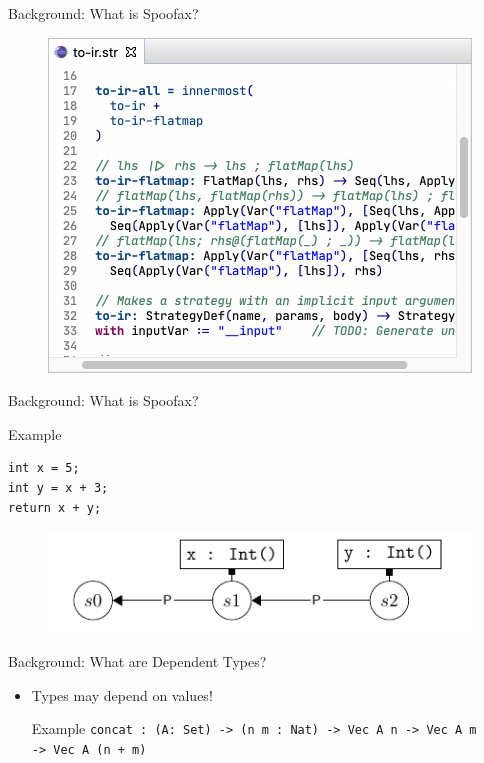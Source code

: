 \documentclass[aspectratio=43]{beamer}
\begin{document}
\begin{frame}[fragile]{Background: What is Spoofax?}
	\begin{figure}
		\includegraphics[width=0.8\linewidth]{img/transformation}
	\end{figure}
\end{frame}

\begin{frame}[fragile]{Background: What is Spoofax?}

\begin{exampleblock}{Example}
\begin{lstlisting}
int x = 5;
int y = x + 3;
return x + y;
\end{lstlisting}
\end{exampleblock}

\begin{figure}
	\includegraphics[width=0.7\linewidth]{img/screenshot005}
\end{figure}


\end{frame}

\begin{frame}[fragile]{Background: What are Dependent Types?}
\begin{itemize}
	\item Types may depend on values!
	\begin{exampleblock}{Example}
		\texttt{concat : (A: Set) -> (n m : Nat) -> Vec A n -> Vec A m
			\\ \hspace*{48pt} -> Vec A (n + m)}
	\end{exampleblock}
\end{itemize}
\end{frame}
\end{document}

